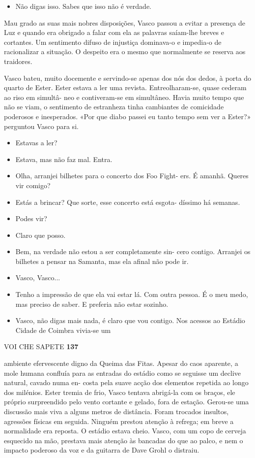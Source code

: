 \begin{itemize}
\tightlist
\item
  Não digas isso. Sabes que isso não é verdade.
\end{itemize}

Mau grado as suas mais nobres disposições, Vasco passou a evitar a
presença de Luz e quando era obrigado a falar com ela as palavras
saíam-lhe breves e cortantes. Um sentimento difuso de injustiça
dominava-o e impedia-o de racionalizar a situação. O despeito era o
mesmo que normalmente se reserva aos traidores.

Vasco bateu, muito docemente e servindo-se apenas dos nós dos dedos, à
porta do quarto de Ester. Ester estava a ler uma revista.
Entreolharam-se, quase cederam ao riso em simultâ- neo e contiveram-se
em simultâneo. Havia muito tempo que não se viam, o sentimento de
estranheza tinha cambiantes de comicidade poderosos e inesperados. «Por
que diabo passei eu tanto tempo sem ver a Ester?» perguntou Vasco para
si.

\begin{itemize}
\tightlist
\item
  Estavas a ler?
\item
  Estava, mas não faz mal. Entra.
\item
  Olha, arranjei bilhetes para o concerto dos Foo Fight- ers. É amanhã.
  Queres vir comigo?
\item
  Estás a brincar? Que sorte, esse concerto está esgota- díssimo há
  semanas.
\item
  Podes vir?
\item
  Claro que posso.
\item
  Bem, na verdade não estou a ser completamente sin- cero contigo.
  Arranjei os bilhetes a pensar na Samanta, mas ela afinal não pode ir.
\item
  Vasco, Vasco...
\item
  Tenho a impressão de que ela vai estar lá. Com outra pessoa. É o meu
  medo, mas preciso de saber. E preferia não estar sozinho.
\item
  Vasco, não digas mais nada, é claro que vou contigo. Nos acessos ao
  Estádio Cidade de Coimbra vivia-se um
\end{itemize}

VOI CHE SAPETE \textbf{137}

ambiente efervescente digno da Queima das Fitas. Apesar do caos
aparente, a mole humana confluía para as entradas do estádio como se
seguisse um declive natural, cavado numa en- costa pela suave acção dos
elementos repetida ao longo dos milénios. Ester tremia de frio, Vasco
tentava abrigá-la com os braços, ele próprio surpreendido pelo vento
cortante e gelado, fora de estação. Gerou-se uma discussão mais viva a
alguns metros de distância. Foram trocados insultos, agressões físicas
em seguida. Ninguém prestou atenção à refrega; em breve a normalidade
era reposta. O estádio estava cheio. Vasco, com um copo de cerveja
esquecido na mão, prestava mais atenção às bancadas do que ao palco, e
nem o impacto poderoso da voz e da guitarra de Dave Grohl o distraiu.

